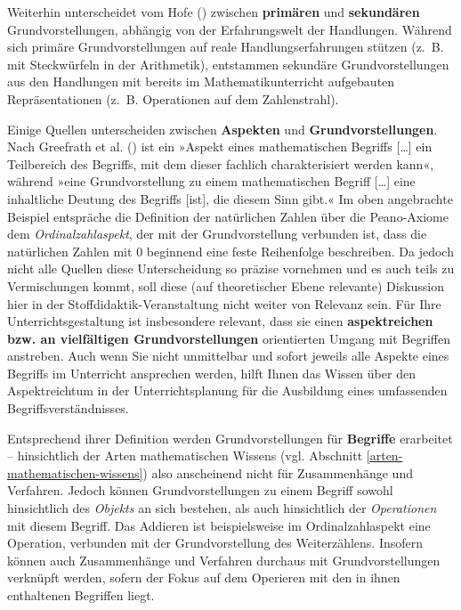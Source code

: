 \documentclass[
]{scrbook}
\theoremstyle{definition}
\theoremstyle{definition}
\theoremstyle{definition}
\theoremstyle{definition}
\theoremstyle{remark}
\begin{document}
Weiterhin unterscheidet vom Hofe () zwischen \textbf{primären} und \textbf{sekundären} Grundvorstellungen, abhängig von der Erfahrungswelt der Handlungen. Während sich primäre Grundvorstellungen auf reale Handlungserfahrungen stützen (z.~B. mit Steckwürfeln in der Arithmetik), entstammen sekundäre Grundvorstellungen aus den Handlungen mit bereits im Mathematikunterricht aufgebauten Repräsentationen (z.~B. Operationen auf dem Zahlenstrahl).

Einige Quellen unterscheiden zwischen \textbf{Aspekten} und \textbf{Grundvorstellungen}. Nach Greefrath et al. () ist ein »Aspekt eines mathematischen Begriffs {[}\ldots{]} ein Teilbereich des Begriffs, mit dem dieser fachlich
charakterisiert werden kann«, während »eine Grundvorstellung zu einem mathematischen Begriff {[}\ldots{]} eine inhaltliche Deutung des Begriffs {[}ist{]}, die diesem Sinn gibt.« Im oben angebrachte Beispiel entspräche die Definition der natürlichen Zahlen über die Peano-Axiome dem \emph{Ordinalzahlaspekt}, der mit der Grundvorstellung verbunden ist, dass die natürlichen Zahlen mit \(0\) beginnend eine feste Reihenfolge beschreiben. Da jedoch nicht alle Quellen diese Unterscheidung so präzise vornehmen und es auch teils zu Vermischungen kommt, soll diese (auf theoretischer Ebene relevante) Diskussion hier in der Stoffdidaktik-Veranstaltung nicht weiter von Relevanz sein. Für Ihre Unterrichtsgestaltung ist insbesondere relevant, dass sie einen \textbf{aspektreichen bzw. an vielfältigen Grundvorstellungen} orientierten Umgang mit Begriffen anstreben. Auch wenn Sie nicht unmittelbar und sofort jeweils alle Aspekte eines Begriffs im Unterricht ansprechen werden, hilft Ihnen das Wissen über den Aspektreichtum in der Unterrichtsplanung für die Ausbildung eines umfassenden Begriffsverständnisses.

Entsprechend ihrer Definition werden Grundvorstellungen für \textbf{Begriffe} erarbeitet -- hinsichtlich der Arten mathematischen Wissens (vgl. Abschnitt \ref{arten-mathematischen-wissens}) also anscheinend nicht für Zusammenhänge und Verfahren. Jedoch können Grundvorstellungen zu einem Begriff sowohl hinsichtlich des \emph{Objekts} an sich bestehen, als auch hinsichtlich der \emph{Operationen} mit diesem Begriff. Das Addieren ist beispielsweise im Ordinalzahlaspekt eine Operation, verbunden mit der Grundvorstellung des Weiterzählens. Insofern können auch Zusammenhänge und Verfahren durchaus mit Grundvorstellungen verknüpft werden, sofern der Fokus auf dem Operieren mit den in ihnen enthaltenen Begriffen liegt.
\end{document}
